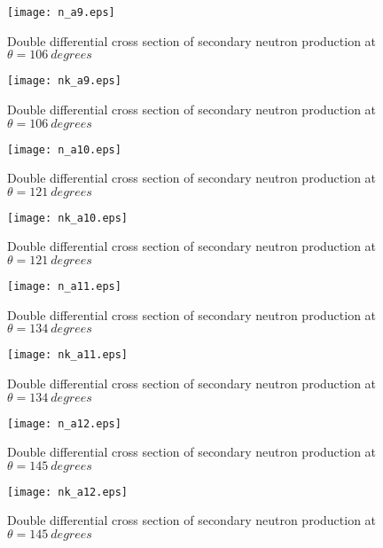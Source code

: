 \documentclass[12pt]{article}
\begin{document}
\clearpage

\begin{figure}[htbp]
\caption{Double differential cross section of secondary neutron production at $\theta = 106~degrees$}
\label{figa9} 
\centerline{\texttt{[image: n\_a9.eps]}}
\end{figure}


\begin{figure}[htbp]
\caption{Double differential cross section of secondary neutron production at $\theta = 106~degrees$}
\label{figa9a} 
\centerline{\texttt{[image: nk\_a9.eps]}}
\end{figure}

\begin{figure}[htbp]
\caption{Double differential cross section of secondary neutron production at $\theta = 121~degrees$}
\label{figa10} 
\centerline{\texttt{[image: n\_a10.eps]}}
\end{figure}

\begin{figure}[htbp]
\caption{Double differential cross section of secondary neutron production at $\theta = 121~degrees$}
\label{figa10a} 
\centerline{\texttt{[image: nk\_a10.eps]}}
\end{figure}

\begin{figure}[htbp]
\caption{Double differential cross section of secondary neutron production at $\theta = 134~degrees$}
\label{figa11} 
\centerline{\texttt{[image: n\_a11.eps]}}
\end{figure}

\begin{figure}[htbp]
\caption{Double differential cross section of secondary neutron production at $\theta = 134~degrees$}
\label{figa11a} 
\centerline{\texttt{[image: nk\_a11.eps]}}
\end{figure}

\begin{figure}[htbp]
\caption{Double differential cross section of secondary neutron production at $\theta = 145~degrees$}
\label{figa12} 
\centerline{\texttt{[image: n\_a12.eps]}}
\end{figure}

\begin{figure}[htbp]
\caption{Double differential cross section of secondary neutron production at $\theta = 145~degrees$}
\label{figa12a} 
\centerline{\texttt{[image: nk\_a12.eps]}}
\end{figure}
\end{document}
